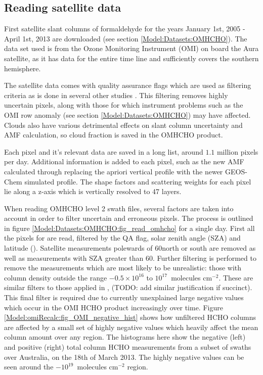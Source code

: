   \subsection{Reading satellite data}
    
    First satellite slant columns of formaldehyde for the years January 1st, 2005 - April 1st, 2013 are downloaded (see section \ref{Model:Datasets:OMHCHO}).
    The data set used is from the Ozone Monitoring Instrument (OMI) on board the Aura satellite, as it has data for the entire time line and sufficiently covers the southern hemisphere.
    
    The satellite data comes with quality assurance flags which are used as filtering criteria as is done in several other studies \parencite[eg.]{Marais2012, Barkley2013, Bauwens2016, Zhu2016}.
    This filtering removes highly uncertain pixels, along with those for which instrument problems such as the OMI row anomaly (see section \ref{Model:Datasets:OMHCHO}) may have affected.
    Clouds also have various detrimental effects on slant column uncertainty and AMF calculation, so cloud fraction is saved in the OMHCHO product.
    
    Each pixel and it's relevant data are saved in a long list, around $1.1$ million pixels per day.
    Additional information is added to each pixel, such as the new AMF calculated through replacing the apriori vertical profile with the newer GEOS-Chem simulated profile.
    The shape factors and scattering weights for each pixel lie along a z-axis which is vertically resolved to 47 layers.
    
    When reading OMHCHO level 2 swath files, several factors are taken into account in order to filter uncertain and erroneous pixels.
    The process is outlined in figure  \ref{Model:Datasets:OMHCHO:fig_read_omhcho} for a single day.
    First all the pixels for are read, filtered by the QA flag, solar zenith angle (SZA) and latitude (\textcite{Palmer2001}).
    Satellite measurements polewards of 60\degr north or south are removed as well as measurements with SZA greater than 60\degr.
    Further filtering is performed to remove the measurements which are most likely to be unrealistic: those with column density outside the range $-0.5 \times 10^{16}$ to $10^{17} $~molecules cm$^{-2}$.
    These are similar filters to those applied in \textcite{Zhu2016}, (TODO: add similar justification if succinct).
    This final filter is required due to currently unexplained large negative values which occur in the OMI HCHO product increasingly over time.
    Figure \ref{Model:omiRecalc:fig_OMI_negative_hist} shows how unfiltered HCHO columns are affected by a small set of highly negative values which heavily affect the mean column amount over any region.
    The histograms here show the negative (left) and positive (right) total column HCHO measurements from a subset of swaths over Australia, on the 18th of March 2013.
    The highly negative values can be seen around the $-10^{19}$~molecules cm$^{-2}$ region.
    
